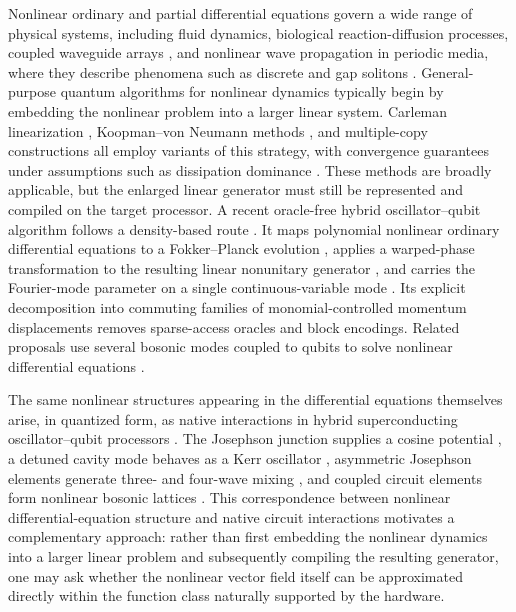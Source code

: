 \documentclass[pra,twocolumn,superscriptaddress,nofootinbib,floatfix]{revtex4-2}
\theoremstyle{remark}
\begin{document}
Nonlinear ordinary and partial differential equations govern a wide range of physical systems, including fluid dynamics, biological reaction-diffusion processes, coupled waveguide arrays \cite{Christodoulides2003Discretizing}, and nonlinear wave propagation in periodic media, where they describe phenomena such as discrete and gap solitons \cite{newell1985solitons}. General-purpose quantum algorithms for nonlinear dynamics typically begin by embedding the nonlinear problem into a larger linear system. Carleman linearization \cite{Liu_2021,doi:10.1137/24M1665799}, Koopman--von Neumann methods \cite{Joseph_2020,brunton2021modernkoopmantheorydynamical}, and multiple-copy constructions \cite{lloyd2020quantumalgorithmnonlineardifferential, tennie2024quantumcomputingnonlineardifferential} all employ variants of this strategy, with convergence guarantees under assumptions such as dissipation dominance \cite{Krovi_2023,tennie2024quantumcomputingnonlineardifferential}. These methods are broadly applicable, but the enlarged linear generator must still be represented and compiled on the target processor.
A recent oracle-free hybrid oscillator--qubit algorithm follows a density-based route \cite{chandramouli2026provableoraclefreequantumalgorithm}. It maps polynomial nonlinear ordinary differential equations to a Fokker--Planck evolution \cite{10.1098/rspa.2025.0016}, applies a warped-phase transformation to the resulting linear nonunitary generator \cite{Jin_2024_schrodingerization}, and carries the Fourier-mode parameter on a single continuous-variable mode \cite{Jin_2024_qumodization}. Its explicit decomposition into commuting families of monomial-controlled momentum displacements removes sparse-access oracles and block encodings. Related proposals use several bosonic modes coupled to qubits to solve nonlinear differential equations \cite{gan2025provablyefficientquantumalgorithms}.

The same nonlinear structures appearing in the differential equations themselves arise, in quantized form, as native interactions in hybrid superconducting oscillator--qubit processors \cite{Liu_2026}. The Josephson junction supplies a cosine potential \cite{JOSEPHSON1962251, Blais_2021}, a detuned cavity mode behaves as a Kerr oscillator \cite{Kirchmair_2013, Nigg_2012}, asymmetric Josephson elements generate three- and four-wave mixing \cite{Frattini_2017, Frattini_2018}, and coupled circuit elements form nonlinear bosonic lattices \cite{Fitzpatrick_2017, Fedorov_2021}. This correspondence between nonlinear differential-equation structure and native circuit interactions motivates a complementary approach: rather than first embedding the nonlinear dynamics into a larger linear problem and subsequently compiling the resulting generator, one may ask whether the nonlinear vector field itself can be approximated directly within the function class naturally supported by the hardware.
\end{document}
